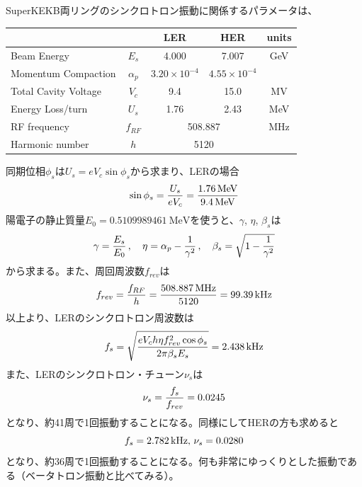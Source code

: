 \documentclass[10pt,a4paper]{jlreq}
\begin{document}
\begin{tcolorbox}[title=\textgt{SuperKEKBのシンクロトロン周波数}, breakable = true]
  SuperKEKB両リングのシンクロトロン振動に関係するパラメータは、

  \vspace{\baselineskip}

  \begin{center}
    \begin{tabular}{l|c|cc|c}
      & & LER   &   HER & units \\ \hline
      Beam Energy & $E_s$ & 4.000 & 7.007 & GeV  \\
      Momentum Compaction & $\alpha_p$ & $3.20\times 10^{-4}$& $4.55\times 10^{-4}$ & \\
      Total Cavity Voltage & $V_c$ & 9.4   &   15.0  &   MV \\
      Energy Loss/turn & $U_s$   & 1.76  &   2.43  & MeV \\
      RF frequency & $f_{RF}$ & \multicolumn{2}{c|}{508.887} & MHz \\
      Harmonic number & $h$       &   \multicolumn{2}{c|}{5120}  &
    \end{tabular}
  \end{center}
  
  \vspace{\baselineskip}

  同期位相$\phi_s$は$U_s = e V_c \sin \phi_s$から求まり、LERの場合
  \begin{equation}
    \sin \phi_s = \frac{U_s}{e V_c} = \frac{\SI{1.76}{\mega\electronvolt}}{\SI{9.4}{\mega\electronvolt}} \notag
  \end{equation}
  陽電子の静止質量$E_0 = \SI{0.5109989461}{\mega\electronvolt}$を使うと、$\gamma$, $\eta$, $\beta_s$は
  \begin{equation}
    \gamma = \frac{E_s}{E_0}\,, \quad \eta = \alpha_p - \frac{1}{\gamma^2}\,, \quad \beta_s = \sqrt{1-\frac{1}{\gamma^2}} \notag
  \end{equation}
  から求まる。また、周回周波数$f_{rev}$は
  \begin{equation}
    f_{rev} = \frac{f_{RF}}{h} = \frac{\SI{508.887}{\mega\hertz}}{5120} = \SI{99.39}{\kilo\hertz} \notag
  \end{equation}
  以上より、LERのシンクロトロン周波数は
  \begin{equation}
    f_s = \sqrt{\frac{e V_c h \eta f_{rev}^2 \cos \phi_s}{2\pi \beta_s E_s}} = \SI{2.438}{\kilo\hertz}\notag
  \end{equation}
  また、LERのシンクロトロン・チューン$\nu_s$は
  \begin{equation}
    \nu_s = \frac{f_s}{f_{rev}} = 0.0245 \notag
  \end{equation}
  となり、約41周で1回振動することになる。同様にしてHERの方も求めると
  \begin{equation}
    f_s = \SI{2.782}{\kilo\hertz}, \, \nu_s = 0.0280 \notag
  \end{equation}
  となり、約36周で1回振動することになる。何も非常にゆっくりとした振動である（ベータトロン振動と比べてみる）。
\end{tcolorbox}
\end{document}
